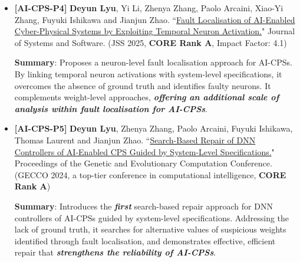 \documentclass[11pt,a4paper]{article}
\newcommand{\highlight}[1]{\textcolor{burgundy}{\textbf{#1}}}
\newcommand{\strongit}[1]{\textbf{\textit{#1}}}
\begin{document}
\begin{itemize}[leftmargin=*]
    \textbf{Summary}: Introduces the \strongit{first} fault localisation approach for AI-CPSs. Addressing the lack of per-inference ground truth in sequential control decisions, it exploits temporal sequences of DNN inferences with suspiciousness metrics to \strongit{identify faulty weights}. Evaluated on \strongit{6,067} faulty benchmarks, it effectively localises faults, \strongit{enabling subsequent analysis and repair of AI-CPSs}.
    
    \item \textbf{[AI-CPS-P4]} \textbf{Deyun Lyu}, Yi Li, Zhenya Zhang, Paolo Arcaini, Xiao-Yi Zhang, Fuyuki Ishikawa and Jianjun Zhao. ``\href{https://www.sciencedirect.com/science/article/abs/pii/S0164121225001438}{Fault Localisation of AI-Enabled Cyber-Physical Systems by Exploiting Temporal Neuron Activation.}" Journal of Systems and Software. (JSS 2025, \highlight{CORE Rank A}, Impact Factor: 4.1) 

    \textbf{Summary}: Proposes a neuron-level fault localisation approach for AI-CPSs. By linking temporal neuron activations with system-level specifications, it overcomes the absence of ground truth and identifies faulty neurons. It complements weight-level approaches, \strongit{offering an additional scale of analysis within fault localisation for AI-CPSs}.
    
    \item \textbf{[AI-CPS-P5]} \textbf{Deyun Lyu}, Zhenya Zhang, Paolo Arcaini, Fuyuki Ishikawa, Thomas Laurent and Jianjun Zhao. ``\href{https://dl.acm.org/doi/10.1145/3638529.3654078}{Search-Based Repair of DNN Controllers of AI-Enabled CPS Guided by System-Level Specifications.}"  Proceedings of the Genetic and Evolutionary Computation Conference. (GECCO 2024, a top-tier conference in computational intelligence, \highlight{CORE Rank A})

    \textbf{Summary}: Introduces the \strongit{first} search-based repair approach for DNN controllers of AI-CPSs guided by system-level specifications. Addressing the lack of ground truth, it searches for alternative values of suspicious weights identified through fault localisation, and demonstrates effective, efficient repair that \strongit{strengthens the reliability of AI-CPSs}.
\end{itemize}
\end{document}
